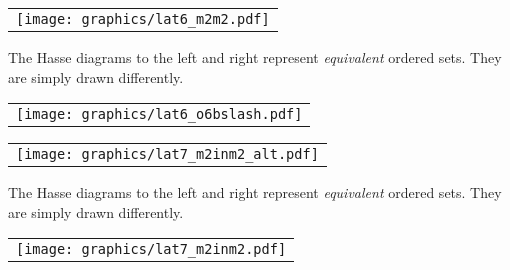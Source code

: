 \begin{tabular}{c}\texttt{[image: graphics/lat6\_m2m2.pdf]}\end{tabular}\hfill%
\begin{minipage}{\tw-50mm}\raggedright
\begin{example}
The Hasse diagrams to the left and right represent 
\emph{equivalent} ordered sets.
They are simply drawn differently.
\end{example}
\end{minipage}%
\hfill\begin{tabular}{c}\texttt{[image: graphics/lat6\_o6bslash.pdf]}\end{tabular}%

\begin{tabular}{c}\texttt{[image: graphics/lat7\_m2inm2\_alt.pdf]}\end{tabular}\hfill%
\begin{minipage}{\tw-50mm}\raggedright
\begin{example}
The Hasse diagrams to the left and right represent 
\emph{equivalent} ordered sets.
They are simply drawn differently.
\end{example}
\end{minipage}%
\hfill\begin{tabular}{c}\texttt{[image: graphics/lat7\_m2inm2.pdf]}\end{tabular}

